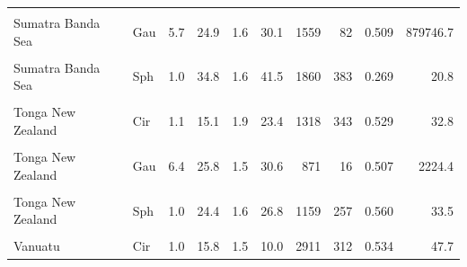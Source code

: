 \begin{ThreePartTable}
\begin{longtable}[t]{llrrrrrrrr}
\cellcolor{gray!6}{Sumatra Banda Sea} & \cellcolor{gray!6}{Exp} & \cellcolor{gray!6}{1.0} & \cellcolor{gray!6}{23.9} & \cellcolor{gray!6}{1.6} & \cellcolor{gray!6}{33.0} & \cellcolor{gray!6}{2276} & \cellcolor{gray!6}{342} & \cellcolor{gray!6}{0.268} & \cellcolor{gray!6}{20.8}\\
Sumatra Banda Sea & Gau & 5.7 & 24.9 & 1.6 & 30.1 & 1559 & 82 & 0.509 & 879746.7\\
\cellcolor{gray!6}{Sumatra Banda Sea} & \cellcolor{gray!6}{Lin} & \cellcolor{gray!6}{1.3} & \cellcolor{gray!6}{23.9} & \cellcolor{gray!6}{1.5} & \cellcolor{gray!6}{25.2} & \cellcolor{gray!6}{1853} & \cellcolor{gray!6}{274} & \cellcolor{gray!6}{0.271} & \cellcolor{gray!6}{21.0}\\
Sumatra Banda Sea & Sph & 1.0 & 34.8 & 1.6 & 41.5 & 1860 & 383 & 0.269 & 20.8\\
\cellcolor{gray!6}{Tonga New Zealand} & \cellcolor{gray!6}{Bes} & \cellcolor{gray!6}{1.0} & \cellcolor{gray!6}{24.4} & \cellcolor{gray!6}{1.6} & \cellcolor{gray!6}{27.5} & \cellcolor{gray!6}{1222} & \cellcolor{gray!6}{76} & \cellcolor{gray!6}{0.540} & \cellcolor{gray!6}{42.4}\\
Tonga New Zealand & Cir & 1.1 & 15.1 & 1.9 & 23.4 & 1318 & 343 & 0.529 & 32.8\\
\cellcolor{gray!6}{Tonga New Zealand} & \cellcolor{gray!6}{Exp} & \cellcolor{gray!6}{1.0} & \cellcolor{gray!6}{25.1} & \cellcolor{gray!6}{1.6} & \cellcolor{gray!6}{28.1} & \cellcolor{gray!6}{1311} & \cellcolor{gray!6}{148} & \cellcolor{gray!6}{0.547} & \cellcolor{gray!6}{32.0}\\
Tonga New Zealand & Gau & 6.4 & 25.8 & 1.5 & 30.6 & 871 & 16 & 0.507 & 2224.4\\
\cellcolor{gray!6}{Tonga New Zealand} & \cellcolor{gray!6}{Lin} & \cellcolor{gray!6}{1.0} & \cellcolor{gray!6}{22.7} & \cellcolor{gray!6}{1.5} & \cellcolor{gray!6}{26.9} & \cellcolor{gray!6}{1174} & \cellcolor{gray!6}{193} & \cellcolor{gray!6}{0.557} & \cellcolor{gray!6}{34.3}\\
Tonga New Zealand & Sph & 1.0 & 24.4 & 1.6 & 26.8 & 1159 & 257 & 0.560 & 33.5\\
\cellcolor{gray!6}{Vanuatu} & \cellcolor{gray!6}{Bes} & \cellcolor{gray!6}{1.0} & \cellcolor{gray!6}{15.5} & \cellcolor{gray!6}{1.5} & \cellcolor{gray!6}{10.2} & \cellcolor{gray!6}{3016} & \cellcolor{gray!6}{104} & \cellcolor{gray!6}{0.520} & \cellcolor{gray!6}{66.3}\\
Vanuatu & Cir & 1.0 & 15.8 & 1.5 & 10.0 & 2911 & 312 & 0.534 & 47.7\\

\end{longtable}
\end{ThreePartTable}
